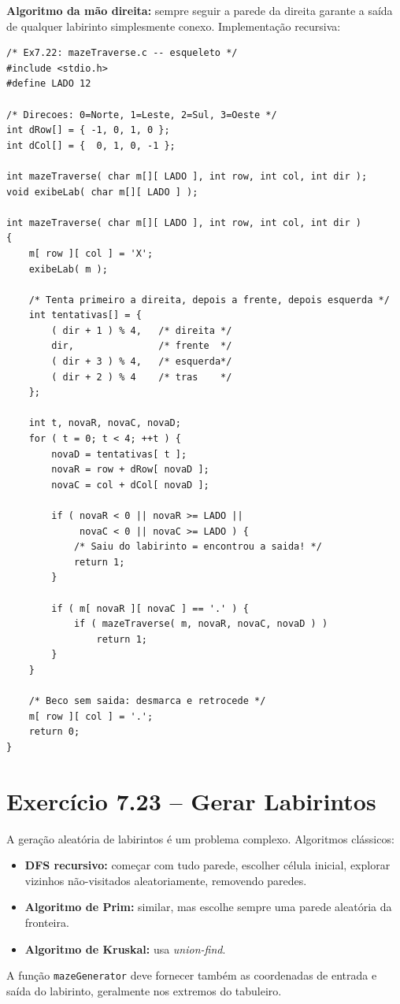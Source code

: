 \documentclass[12pt,a4paper]{article}
\begin{document}
\begin{respostabox}
\textbf{Algoritmo da mão direita:} sempre seguir a parede da direita garante a saída
de qualquer labirinto simplesmente conexo. Implementação recursiva:

\begin{lstlisting}
/* Ex7.22: mazeTraverse.c -- esqueleto */
#include <stdio.h>
#define LADO 12

/* Direcoes: 0=Norte, 1=Leste, 2=Sul, 3=Oeste */
int dRow[] = { -1, 0, 1, 0 };
int dCol[] = {  0, 1, 0, -1 };

int mazeTraverse( char m[][ LADO ], int row, int col, int dir );
void exibeLab( char m[][ LADO ] );

int mazeTraverse( char m[][ LADO ], int row, int col, int dir )
{
    m[ row ][ col ] = 'X';
    exibeLab( m );

    /* Tenta primeiro a direita, depois a frente, depois esquerda */
    int tentativas[] = {
        ( dir + 1 ) % 4,   /* direita */
        dir,               /* frente  */
        ( dir + 3 ) % 4,   /* esquerda*/
        ( dir + 2 ) % 4    /* tras    */
    };

    int t, novaR, novaC, novaD;
    for ( t = 0; t < 4; ++t ) {
        novaD = tentativas[ t ];
        novaR = row + dRow[ novaD ];
        novaC = col + dCol[ novaD ];

        if ( novaR < 0 || novaR >= LADO ||
             novaC < 0 || novaC >= LADO ) {
            /* Saiu do labirinto = encontrou a saida! */
            return 1;
        }

        if ( m[ novaR ][ novaC ] == '.' ) {
            if ( mazeTraverse( m, novaR, novaC, novaD ) )
                return 1;
        }
    }

    /* Beco sem saida: desmarca e retrocede */
    m[ row ][ col ] = '.';
    return 0;
}
\end{lstlisting}
\end{respostabox}

\section{Exercício 7.23 -- Gerar Labirintos}

\begin{respostabox}
A geração aleatória de labirintos é um problema complexo. Algoritmos clássicos:
\begin{itemize}[noitemsep]
  \item \textbf{DFS recursivo:} começar com tudo parede, escolher célula inicial,
  explorar vizinhos não-visitados aleatoriamente, removendo paredes.
  \item \textbf{Algoritmo de Prim:} similar, mas escolhe sempre uma parede aleatória
  da fronteira.
  \item \textbf{Algoritmo de Kruskal:} usa \textit{union-find}.
\end{itemize}

A função \texttt{mazeGenerator} deve fornecer também as coordenadas de entrada e
saída do labirinto, geralmente nos extremos do tabuleiro.
\end{respostabox}
\end{document}
